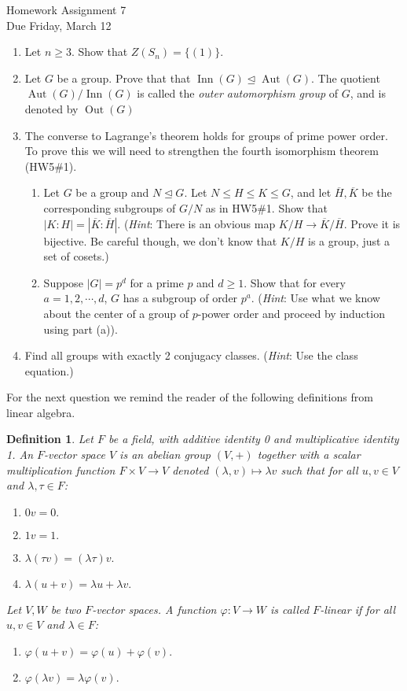 \documentclass[11pt]{article}
\newtheorem{definition}{Definition}
\newcommand{\Aut}{\operatorname{Aut}}
\newcommand{\Inn}{\operatorname{Inn}}
\newcommand{\Out}{\operatorname{Out}}
\begin{document}
\begin{center}
\Large {Homework Assignment 7}\\
\small {Due Friday, March 12}
\end{center}
\begin{enumerate}
  \item Let $n\ge3$.  Show that $Z(S_n) = \{(1)\}$.
  \item Let $G$ be a group.  Prove that that $\Inn(G)\unlhd\Aut(G)$.  The quotient $\Aut(G)/\Inn(G)$ is called the \textit{outer automorphism group} of $G$, and is denoted by $\Out(G)$
  \item The converse to Lagrange's theorem holds for groups of prime power order.  To prove this we will need to strengthen the fourth isomorphism theorem (HW5\#1).
  \begin{enumerate}
    \item Let $G$ be a group and $N\unlhd G$.  Let $N\le H\le K\le G$, and let $\overline H,\overline K$ be the corresponding subgroups of $G/N$ as in HW5\#1.  Show that $|K:H| = |\overline K:\overline H|$.  (\textit{Hint}: There is an obvious map $K/H\to\overline K/\overline H$.  Prove it is bijective.  Be careful though, we don't know that $K/H$ is a group, just a set of cosets.)
    \item Suppose $|G| = p^d$ for a prime $p$ and $d\ge1$.  Show that for every $a = 1,2,\cdots,d$, $G$ has a subgroup of order $p^a$.  (\textit{Hint}: Use what we know about the center of a group of $p$-power order and proceed by induction using part (a)).
  \end{enumerate}
  \item Find all groups with exactly 2 conjugacy classes.  (\textit{Hint}: Use the class equation.)
\end{enumerate}
For the next question we remind the reader of the following definitions from linear algebra.
\begin{definition}
  Let $F$ be a field, with additive identity 0 and multiplicative identity 1.  An \textit{$F$-vector space} $V$ is an abelian group $(V,+)$ together with a \textit{scalar multiplication function} $F\times V\to V$ denoted $(\lambda,v)\mapsto \lambda v$ such that for all $u,v\in V$ and $\lambda,\tau\in F$:
  \begin{enumerate}[(1)]
    \item $0v = 0.$
    \item $1v = 1.$
    \item $\lambda(\tau v) = (\lambda\tau)v.$
    \item $\lambda(u+v) = \lambda u+\lambda v.$
  \end{enumerate}
  Let $V,W$ be two $F$-vector spaces.  A function $\varphi:V\to W$ is called \textit{$F$-linear} if for all $u,v\in V$ and $\lambda\in F$:
  \begin{enumerate}[(1)]
    \item $\varphi(u+v) = \varphi(u) + \varphi(v).$
    \item $\varphi(\lambda v) = \lambda\varphi(v).$
  \end{enumerate}
\end{definition}
\end{document}

